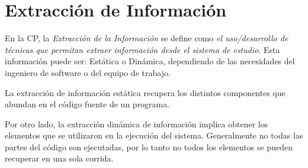 \documentclass[a4paper,12pt]{report}
\begin{document}





\section{Extracción de Información}

En la CP, la \textit{Extracción de la Información} se define como \textit{el uso/desarrollo de técnicas que permitan extraer información desde el sistema de estudio}. 
Esta información puede ser: Estática o Dinámica, dependiendo de las necesidades del 
ingeniero de software o del equipo de trabajo.

La extracción de información estática recupera los distintos componentes que abundan en el código fuente de un programa\cite{AHUL06}. 



Por otro lado, la extracción dinámica de información implica obtener los elementos que se utilizaron en la ejecución del sistema\cite{THBE99}. Generalmente no todas las partes del código son ejecutadas, por lo tanto no todos los elementos se pueden recuperar en una sola corrida.

 
\end{document}
